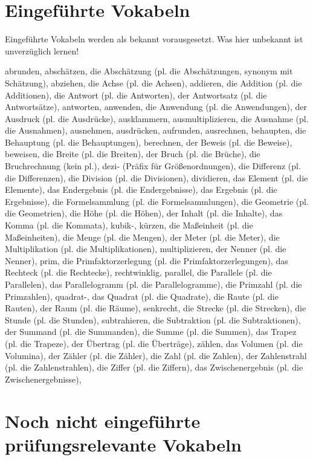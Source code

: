 \section{Eingeführte Vokabeln}

Eingeführte Vokabeln werden als bekannt vorausgesetzt. Was hier unbekannt ist unverzüglich lernen!

abrunden,
abschätzen,
die Abschätzung (pl. die Abschätzungen, synonym mit Schätzung),
abziehen,
die Achse (pl. die Achsen),
addieren,
die Addition (pl. die Additionen),
die Antwort (pl. die Antworten),
der Antwortsatz (pl. die Antwortsätze),
antworten,
anwenden,
die Anwendung (pl. die Anwendungen),
der Ausdruck (pl. die Ausdrücke),
ausklammern,
ausmultiplizieren,
die Ausnahme (pl. die Ausnahmen),
ausnehmen,
ausdrücken,
aufrunden,
ausrechnen,
behaupten,
die Behauptung (pl. die Behauptungen),
berechnen,
der Beweis (pl. die Beweise),
beweisen,
die Breite (pl. die Breiten),
der Bruch (pl. die Brüche),
die Bruchrechnung (kein pl.),
dezi- (Präfix für Größenordnungen),
die Differenz (pl. die Differenzen),
die Division (pl. die Divisionen),
dividieren,
das Element (pl. die Elemente),
das Endergebnis (pl. die Endergebnisse),
das Ergebnis (pl. die Ergebnisse),
die Formelsammlung (pl. die Formelsammlungen),
die Geometrie (pl. die Geometrien),
die Höhe (pl. die Höhen),
der Inhalt (pl. die Inhalte),
das Komma (pl. die Kommata),
kubik-,
kürzen,
die Maßeinheit (pl. die Maßeinheiten),
die Menge (pl. die Mengen),
der Meter (pl. die Meter),
die Multiplikation (pl. die Multiplikationen),
multiplizieren,
der Nenner (pl. die Nenner),
prim,
die Primfaktorzerlegung (pl. die Primfaktorzerlegungen),
das Rechteck (pl. die Rechtecke),
rechtwinklig,
parallel,
die Parallele (pl. die Parallelen),
das Parallelogramm (pl. die Parallelogramme),
die Primzahl (pl. die Primzahlen),
quadrat-,
das Quadrat (pl. die Quadrate),
die Raute (pl. die Rauten),
der Raum (pl. die Räume),
senkrecht,
die Strecke (pl. die Strecken),
die Stunde (pl. die Stunden),
subtrahieren,
die Subtraktion (pl. die Subtraktionen),
der Summand (pl. die Summanden),
die Summe (pl. die Summen),
das Trapez (pl. die Trapeze),
der Übertrag (pl. die Überträge),
zählen,
das Volumen (pl. die Volumina),
der Zähler (pl. die Zähler),
die Zahl (pl. die Zahlen),
der Zahlenstrahl (pl. die Zahlenstrahlen),
die Ziffer (pl. die Ziffern),
das Zwischenergebnis (pl. die Zwischenergebnisse),

\section{Noch nicht eingeführte prüfungsrelevante Vokabeln}

